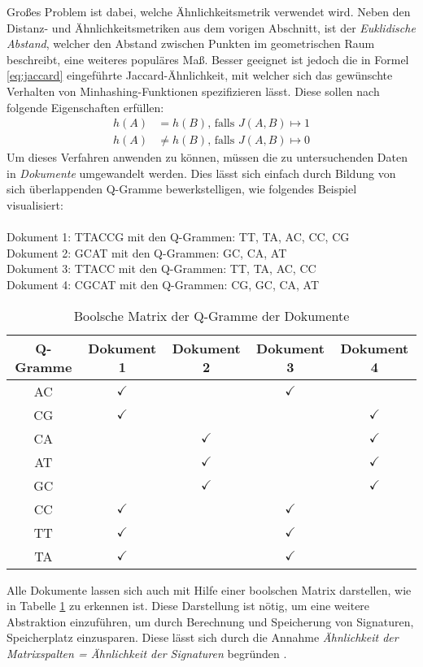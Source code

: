 Großes Problem ist dabei, welche Ähnlichkeitsmetrik verwendet wird. Neben den Distanz- und Ähnlichkeitsmetriken aus dem vorigen Abschnitt, ist der \textit{Euklidische Abstand}, welcher den Abstand zwischen Punkten im geometrischen Raum beschreibt, eine weiteres populäres Maß. Besser geeignet ist jedoch die in Formel \eqref{eq:jaccard} eingeführte Jaccard-Ähnlichkeit, mit welcher sich das gewünschte Verhalten von Minhashing-Funktionen spezifizieren lässt. Diese sollen nach \citet{Indyk1998} folgende Eigenschaften erfüllen:
\begin{align*}
		h(A) &= h(B) \text{, falls } J(A,B) \mapsto 1 \\
		h(A) &\neq h(B) \text{, falls } J(A,B) \mapsto 0
\end{align*} 
Um dieses Verfahren anwenden zu können, müssen die zu untersuchenden Daten in \textit{Dokumente} umgewandelt werden. Dies lässt sich einfach durch Bildung von sich überlappenden Q-Gramme bewerkstelligen, wie folgendes Beispiel visualisiert: \\\\
Dokument 1: TTACCG mit den Q-Grammen: TT, TA, AC, CC, CG \\ 
Dokument 2: GCAT mit den Q-Grammen: GC, CA, AT \\
Dokument 3: TTACC mit den Q-Grammen: TT, TA, AC, CC \\
Dokument 4: CGCAT mit den Q-Grammen: CG, GC, CA, AT
\begin{table}[H]
\begin{center}
	\begin{tabular}{|c|c|c|c|c|}
	\hline 
	Q-Gramme & Dokument 1 & Dokument 2 & Dokument 3 & Dokument 4\\ 
	\hline 
	AC & $\checkmark$ & & $\checkmark$ &\\ 
	CG &  $\checkmark$& & &  $\checkmark$\\ 
	CA & & $\checkmark$ & & $\checkmark$\\ 
	AT & & $\checkmark$ & & $\checkmark$\\ 
	GC & &  $\checkmark$ & & $\checkmark$\\ 
	CC & $\checkmark$ &  & $\checkmark$ & \\ 
	TT & $\checkmark$  & &  $\checkmark$ &\\
	TA & $\checkmark$  & &   $\checkmark$&\\ 
	\hline 
	\end{tabular} 
\end{center}
\caption{Boolsche Matrix der Q-Gramme der Dokumente}
\label{table:bool-qgramm}
\end{table}
Alle Dokumente lassen sich auch mit Hilfe einer boolschen Matrix darstellen, wie in Tabelle \ref{table:bool-qgramm} zu erkennen ist. Diese Darstellung ist nötig, um eine weitere Abstraktion einzuführen, um durch Berechnung und Speicherung von Signaturen, Speicherplatz einzusparen. Diese lässt sich durch die Annahme \textit{Ähnlichkeit der Matrixspalten = Ähnlichkeit der Signaturen} begründen \citep{Leskovec2014a}.

